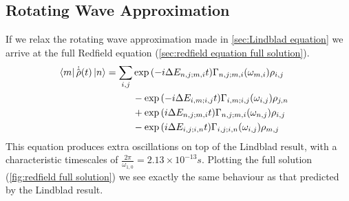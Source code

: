 \subsection{Rotating Wave Approximation}\label{sec:rotating wave approximation}
If we relax the rotating wave approximation
made in \cref{sec:Lindblad equation}
we arrive at the full Redfield equation
(\cref{sec:redfield equation full solution}).
\begin{align}
    \bra{m}\dot{\hat{\rho{}}}(t) \ket{n} & = \begin{aligned}[t]
        \sum_{i,j} &
        \exp{(-i\Delta{}E_{n,j;m,i} t)}
        \Gamma_{n,j;m, i}(\omega_{m,i})
        \rho_{i,j}   \\
                   &
        -\exp{(-i\Delta{}E_{i,m;i,j} t)}
        \Gamma_{i,m;i, j}(\omega_{i,j})
        \rho_{j, n}  \\
                   &
        +\exp{(i\Delta{}E_{n,j;m,i} t)}
        \Gamma_{n,j; m, i}(\omega_{n,j})
        \rho_{i, j}  \\
                   &
        -\exp{(i\Delta{}E_{i,j;i,n} t)}
        \Gamma_{i,j; i, n}(\omega_{i,j})
        \rho_{m, j}
    \end{aligned}
\end{align}
This equation produces extra oscillations
on top of the Lindblad result, with
a characteristic timescales of
\(\frac{2\pi}{\omega_{1,0}} = 2.13\times{}10^{-13}s\). Plotting
the full solution (\cref{fig:redfield full solution})
we see exactly the same behaviour as that
predicted by the Lindblad result.
